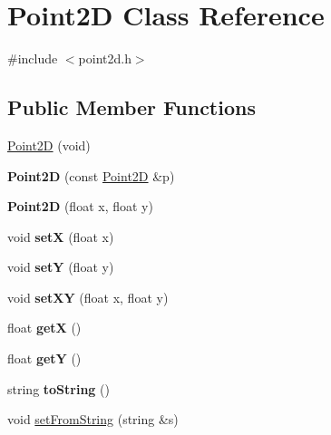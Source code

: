 \hypertarget{class_point2_d}{
\section{Point2D Class Reference}
\label{class_point2_d}
}


{\ttfamily \#include $<$point2d.h$>$}

\subsection*{Public Member Functions}
\begin{DoxyCompactItemize}
\item 
\hyperlink{class_point2_d_a1b119032e0b60ef27f8610d640e241e2}{Point2D} (void)
\item 
\hypertarget{class_point2_d_aeee3d27d547e4e4eb565bc91c0ea38d4}{
{\bfseries Point2D} (const \hyperlink{class_point2_d}{Point2D} \&p)}
\label{class_point2_d_aeee3d27d547e4e4eb565bc91c0ea38d4}

\item 
\hypertarget{class_point2_d_a0262726e46d2f7c32e886d98ba6b72a1}{
{\bfseries Point2D} (float x, float y)}
\label{class_point2_d_a0262726e46d2f7c32e886d98ba6b72a1}

\item 
\hypertarget{class_point2_d_ae85945d6f3dd852fc7b54a62876ceec0}{
void {\bfseries setX} (float x)}
\label{class_point2_d_ae85945d6f3dd852fc7b54a62876ceec0}

\item 
\hypertarget{class_point2_d_a0f99b0f7576dbeefafd88c545d80e061}{
void {\bfseries setY} (float y)}
\label{class_point2_d_a0f99b0f7576dbeefafd88c545d80e061}

\item 
\hypertarget{class_point2_d_a8a76ed85865034ac6b89053bb0d3eefb}{
void {\bfseries setXY} (float x, float y)}
\label{class_point2_d_a8a76ed85865034ac6b89053bb0d3eefb}

\item 
\hypertarget{class_point2_d_a1d99db0ab55004e689f6df96fe159fb8}{
float {\bfseries getX} ()}
\label{class_point2_d_a1d99db0ab55004e689f6df96fe159fb8}

\item 
\hypertarget{class_point2_d_ae4a95e28df1efd23b68a377b35624cfd}{
float {\bfseries getY} ()}
\label{class_point2_d_ae4a95e28df1efd23b68a377b35624cfd}

\item 
\hypertarget{class_point2_d_af6db77bd62da9048a360e099ac36b569}{
string {\bfseries toString} ()}
\label{class_point2_d_af6db77bd62da9048a360e099ac36b569}

\item 
void \hyperlink{class_point2_d_a7f0d35c684e22b47fc42cb142ec6c50e}{setFromString} (string \&s)
\end{DoxyCompactItemize}


